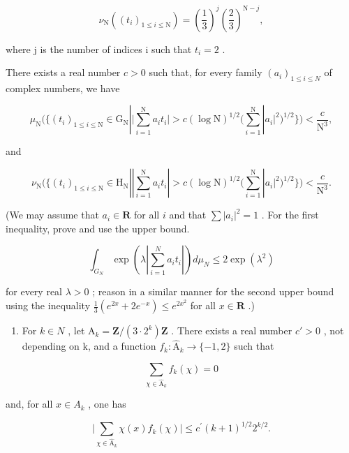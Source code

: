 \[
\nu_ {\mathrm{N}} ((t _ {i}) _ {1 \leqslant i \leqslant \mathrm{N}}) = \left(\frac {1}{3}\right) ^ {j} \left(\frac {2}{3}\right) ^ {\mathrm{N} - j},
\]

where j is the number of indices i such that \(t_{i}=2\) .

There exists a real number \(c > 0\) such that, for every family \((a_{i})_{1\leqslant i\leqslant N}\) of complex numbers, we have

\[
\mu_ {\mathrm{N}} \Big (\Big \{(t _ {i}) _ {1 \leqslant i \leqslant \mathrm{N}} \in \mathrm{G} _ {\mathrm{N}} | \Big | \sum_ {i = 1} ^ {\mathrm{N}} a _ {i} t _ {i} \Big | > c (\log \mathrm{N}) ^ {1 / 2} \Big (\sum_ {i = 1} ^ {\mathrm{N}} | a _ {i} | ^ {2} \Big) ^ {1 / 2} \Big \} \Big) <   \frac {c}{\mathrm{N} ^ {3}},
\]

and

\[
\nu_ {\mathrm{N}} \Big (\Big \{(t _ {i}) _ {1 \leqslant i \leqslant \mathrm{N}} \in \mathrm{H} _ {\mathrm{N}} | \left| \sum_ {i = 1} ^ {\mathrm{N}} a _ {i} t _ {i} \right| > c (\log \mathrm{N}) ^ {1 / 2} \Big (\sum_ {i = 1} ^ {\mathrm{N}} | a _ {i} | ^ {2} \Big) ^ {1 / 2} \Big \} \Big) <   \frac {c}{\mathrm{N} ^ {3}}.
\]

(We may assume that \(a_{i} \in \mathbf{R}\) for all \(i\) and that \(\sum |a_{i}|^{2} = 1\) . For the first inequality, prove and use the upper bound.

\[
\int_ {G _ {N}} \exp \left(\lambda \left| \sum_ {i = 1} ^ {N} a _ {i} t _ {i} \right|\right) d \mu_ {N} \leqslant 2 \exp (\lambda^ {2})
\]

for every real \(\lambda > 0\) ; reason in a similar manner for the second upper bound using the inequality \(\frac{1}{3}(e^{2x} + 2e^{-x}) \leqslant e^{2x^2}\) for all \(x \in \mathbf{R}\) .)

\begin{enumerate}
\def\labelenumi{\alph{enumi})}
\setcounter{enumi}{1}
\tightlist
\item
  For \(k \in N\) , let \(\mathrm{A}_{k} = \mathbf{Z}/(3 \cdot 2^{k})\mathbf{Z}\) . There exists a real number \(c' > 0\) , not depending on k, and a function \(f_{k} \colon \widehat{\mathrm{A}}_{k} \to \{-1, 2\}\) such that
\end{enumerate}

\[
\sum_ {\chi \in \widehat {\mathrm{A}} _ {k}} f _ {k} (\chi) = 0
\]

and, for all \(x \in A_{k}\) , one has

\[
\Big | \sum_ {\chi \in \widehat {\mathrm{A}} _ {k}} \chi (x) f _ {k} (\chi) \Big | \leqslant c ^ {\prime} (k + 1) ^ {1 / 2} 2 ^ {k / 2}.
\]


